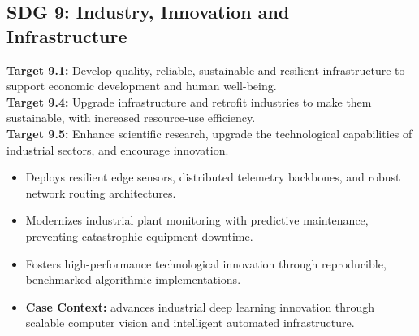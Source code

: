 \subsection{SDG 9: Industry, Innovation and Infrastructure}
\noindent\textbf{Target 9.1:} Develop quality, reliable, sustainable and resilient infrastructure to support economic development and human well-being. \\
\noindent\textbf{Target 9.4:} Upgrade infrastructure and retrofit industries to make them sustainable, with increased resource-use efficiency. \\
\noindent\textbf{Target 9.5:} Enhance scientific research, upgrade the technological capabilities of industrial sectors, and encourage innovation.
\begin{itemize}
  \item Deploys resilient edge sensors, distributed telemetry backbones, and robust network routing architectures.
  \item Modernizes industrial plant monitoring with predictive maintenance, preventing catastrophic equipment downtime.
  \item Fosters high-performance technological innovation through reproducible, benchmarked algorithmic implementations.
  \item \textbf{Case Context:} advances industrial deep learning innovation through scalable computer vision and intelligent automated infrastructure.
\end{itemize}
